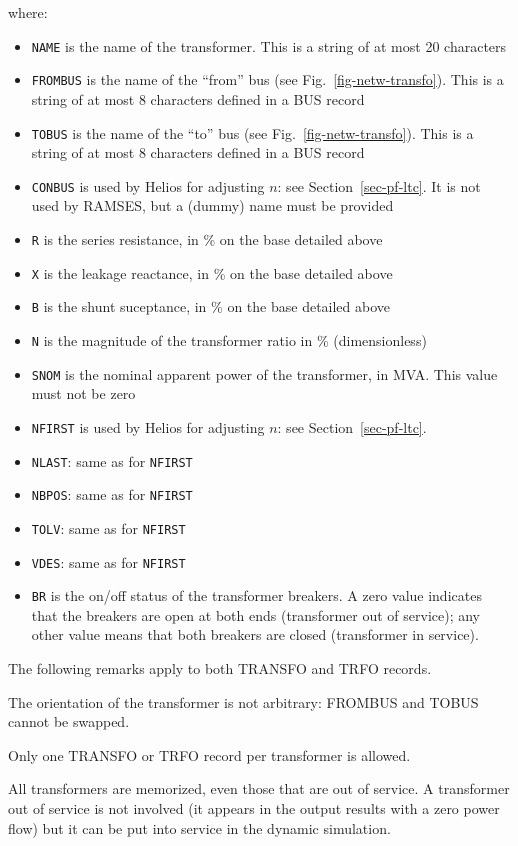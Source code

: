 where:
\begin{itemize}
\item {\tt NAME} is the name of the transformer.  This is a string of at most 20 characters
\item {\tt FROMBUS} is the name of the ``from'' bus (see Fig.~\ref{fig-netw-transfo}). This is a string of at most 8 characters defined in a BUS record
\item {\tt TOBUS} is the name of the ``to'' bus (see Fig.~\ref{fig-netw-transfo}). This is a string of at most 8 characters defined in a BUS record
\item{\tt CONBUS} is used by Helios for adjusting $n$: see Section~\ref{sec-pf-ltc}. It is not used by RAMSES, but a (dummy) name must be provided
\item{\tt R} is the series resistance, in \% on the base detailed above
\item{\tt X} is the leakage reactance, in \% on the base detailed above
\item{\tt B} is the shunt suceptance, in \% on the base detailed above
\item{\tt N} is the magnitude of the transformer ratio in \% (dimensionless)
\item{\tt SNOM} is the nominal apparent power of the transformer, in MVA. This value must not be zero
\item{\tt NFIRST} is used by Helios for adjusting $n$: see Section~\ref{sec-pf-ltc}.
\item{\tt NLAST}: same as for {\tt NFIRST}
\item{\tt NBPOS}: same as for {\tt NFIRST}
\item{\tt TOLV}: same as for {\tt NFIRST}
\item{\tt VDES}: same as for {\tt NFIRST}
\item{\tt BR} is the on/off status of the transformer breakers. A zero value indicates that the breakers are open at both ends (transformer out of service); any other value means that both breakers are closed (transformer in service).
\end{itemize}

The following remarks apply to both TRANSFO and TRFO records.

The orientation of the transformer is not arbitrary: FROMBUS and TOBUS cannot be swapped.

Only one TRANSFO or TRFO record per transformer is allowed.

All transformers are memorized, even those that are out of service. A transformer out of service is not involved (it appears in the output results with a zero power flow) but it can be put into service in the dynamic simulation.

